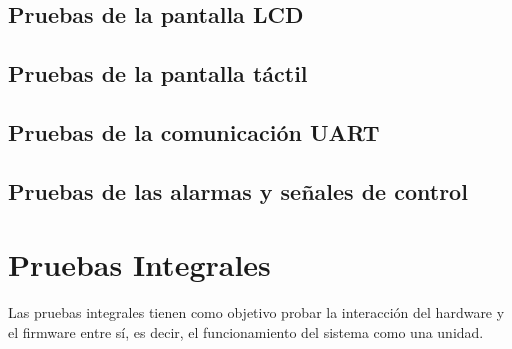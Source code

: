 \subsection{Pruebas de la pantalla LCD}

\subsection{Pruebas de la pantalla táctil}

\subsection{Pruebas de la comunicación UART}

\subsection{Pruebas de las alarmas y señales de control}

\section{Pruebas Integrales}
\label{sec:pruebasInt}

Las pruebas integrales tienen como objetivo probar la interacción del hardware y el firmware entre sí, es decir, el funcionamiento del sistema como una unidad.